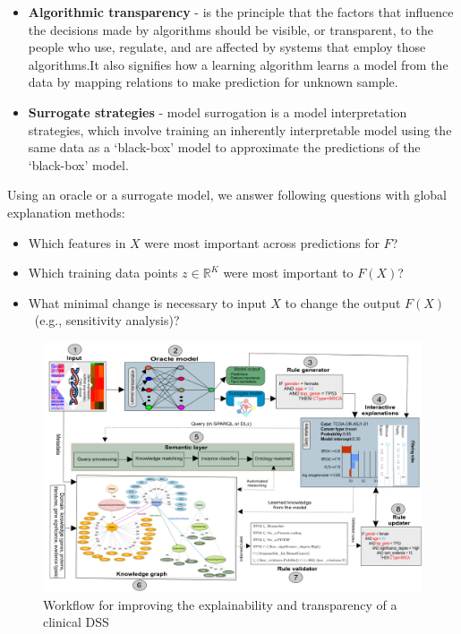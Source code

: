 \begin{itemize}[noitemsep]
    \item {\textbf{Algorithmic transparency}} - is the principle that the factors that influence the decisions made by algorithms should be visible, or transparent, to the people who use, regulate, and are affected by systems that employ those algorithms.It also signifies how a learning algorithm learns a model from the data by mapping relations to make prediction for unknown sample.
    \item \textbf{Surrogate strategies} - model surrogation is a model interpretation strategies, which involve training an inherently interpretable model using the same data as a `black-box' model to approximate the predictions of the `black-box' model. 
\end{itemize}

\hspace*{3.5mm} Using an oracle or a surrogate model, we answer following questions with global explanation methods: 

\vspace{-2mm}
\begin{itemize}[noitemsep]
    \item Which features in $X$ were most important across predictions for $F$? 
    \item Which training data points $z \in \mathbb{R}^{K}$ were most important to $F(X)$? 
    \item What minimal change is necessary to input $X$ to change the output $F(X)$~(e.g., sensitivity analysis)? 
\end{itemize}
\vspace{-2mm}

\begin{figure}
	\centering
	\includegraphics[width=\textwidth]{images/reasoning_wf.png}	
    \caption{Workflow for improving the explainability and transparency of a clinical DSS}
	\label{fig:wf_overall_approach}
\end{figure}

